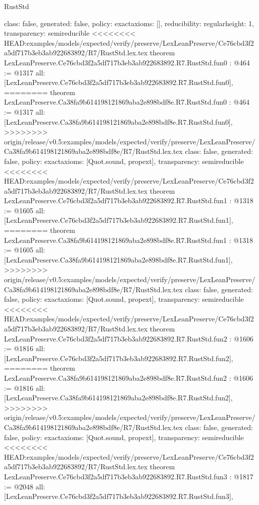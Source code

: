 \begin{lexlean}{RustStd}
\begin{coremodule}
{\begin{coremodule}
{{{  class: false,
  generated: false,
  policy: exact{axioms: []},
  reducibility: regular{height: 1},
  transparency: semireducible
}
<<<<<<<< HEAD:examples/models/expected/verify/preserve/LexLeanPreserve/Ce76cbd3f2a5df717b3eb3ab922683892/R7/RustStd.lex.tex
theorem LexLeanPreserve.Ce76cbd3f2a5df717b3eb3ab922683892.R7.RustStd.fun0 : @464 := @1317 {
  all: [LexLeanPreserve.Ce76cbd3f2a5df717b3eb3ab922683892.R7.RustStd.fun0],
========
theorem LexLeanPreserve.Ca38fa9b614198121869aba2e898bdf8e.R7.RustStd.fun0 : @464 := @1317 {
  all: [LexLeanPreserve.Ca38fa9b614198121869aba2e898bdf8e.R7.RustStd.fun0],
>>>>>>>> origin/release/v0.5:examples/models/expected/verify/preserve/LexLeanPreserve/Ca38fa9b614198121869aba2e898bdf8e/R7/RustStd.lex.tex
  class: false,
  generated: false,
  policy: exact{axioms: [Quot.sound, propext]},
  transparency: semireducible
}
<<<<<<<< HEAD:examples/models/expected/verify/preserve/LexLeanPreserve/Ce76cbd3f2a5df717b3eb3ab922683892/R7/RustStd.lex.tex
theorem LexLeanPreserve.Ce76cbd3f2a5df717b3eb3ab922683892.R7.RustStd.fun1 : @1318 := @1605 {
  all: [LexLeanPreserve.Ce76cbd3f2a5df717b3eb3ab922683892.R7.RustStd.fun1],
========
theorem LexLeanPreserve.Ca38fa9b614198121869aba2e898bdf8e.R7.RustStd.fun1 : @1318 := @1605 {
  all: [LexLeanPreserve.Ca38fa9b614198121869aba2e898bdf8e.R7.RustStd.fun1],
>>>>>>>> origin/release/v0.5:examples/models/expected/verify/preserve/LexLeanPreserve/Ca38fa9b614198121869aba2e898bdf8e/R7/RustStd.lex.tex
  class: false,
  generated: false,
  policy: exact{axioms: [Quot.sound, propext]},
  transparency: semireducible
}
<<<<<<<< HEAD:examples/models/expected/verify/preserve/LexLeanPreserve/Ce76cbd3f2a5df717b3eb3ab922683892/R7/RustStd.lex.tex
theorem LexLeanPreserve.Ce76cbd3f2a5df717b3eb3ab922683892.R7.RustStd.fun2 : @1606 := @1816 {
  all: [LexLeanPreserve.Ce76cbd3f2a5df717b3eb3ab922683892.R7.RustStd.fun2],
========
theorem LexLeanPreserve.Ca38fa9b614198121869aba2e898bdf8e.R7.RustStd.fun2 : @1606 := @1816 {
  all: [LexLeanPreserve.Ca38fa9b614198121869aba2e898bdf8e.R7.RustStd.fun2],
>>>>>>>> origin/release/v0.5:examples/models/expected/verify/preserve/LexLeanPreserve/Ca38fa9b614198121869aba2e898bdf8e/R7/RustStd.lex.tex
  class: false,
  generated: false,
  policy: exact{axioms: [Quot.sound, propext]},
  transparency: semireducible
}
<<<<<<<< HEAD:examples/models/expected/verify/preserve/LexLeanPreserve/Ce76cbd3f2a5df717b3eb3ab922683892/R7/RustStd.lex.tex
theorem LexLeanPreserve.Ce76cbd3f2a5df717b3eb3ab922683892.R7.RustStd.fun3 : @1817 := @2048 {
  all: [LexLeanPreserve.Ce76cbd3f2a5df717b3eb3ab922683892.R7.RustStd.fun3],
}}}}}}
\end{coremodule}}
\end{coremodule}
\end{lexlean}
